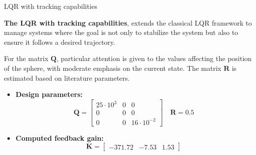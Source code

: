 \begin{frame}{LQR with tracking capabilities}

    \textbf{The LQR with tracking capabilities}, extends the classical LQR framework to manage systems where the goal is not only to stabilize the system but also to ensure it follows a desired trajectory.

    For the matrix $\mathbf{Q}$, particular attention is given to the values affecting the position of the sphere, with moderate emphasis on the current state.
    The matrix $\mathbf{R}$ is estimated based on literature parameters.

    \begin{itemize}
        \item \textbf{Design parameters:}
              \begin{equation}
                  \mathbf{Q} =
                  \begin{bmatrix}
                      25\cdot10^3 & 0 & 0              \\
                      0           & 0 & 0              \\
                      0           & 0 & 16\cdot10^{-2}
                  \end{bmatrix}
                  \quad
                  \mathbf{R} = 0.5
              \end{equation}

        \item \textbf{Computed feedback gain:}
              \begin{equation}
                  \mathbf{K} =
                  \begin{bmatrix}
                      -371.72 & -7.53 & 1.53
                  \end{bmatrix}
              \end{equation}
    \end{itemize}
\end{frame}



